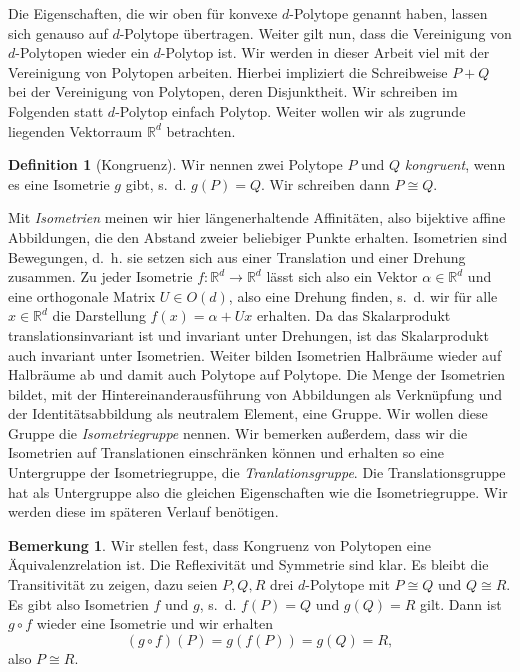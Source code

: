 \documentclass[11pt,titlepage]{article}
\newcommand{\setR}{\mathbb{R}}
\theoremstyle{definition}
\newtheorem{definition}[theorem]{Definition}
\newtheorem{remark}[theorem]{Bemerkung}
\theoremstyle{remark}
\begin{document}
	Die Eigenschaften, die wir oben für konvexe $d$-Polytope genannt haben, 
	lassen sich genauso auf $d$-Polytope übertragen. Weiter gilt nun, dass 
	die Vereinigung von $d$-Polytopen wieder ein $d$-Polytop ist. 
	Wir werden in dieser Arbeit viel mit der Vereinigung von Polytopen arbeiten. 
	Hierbei impliziert die Schreibweise $P+Q$ bei der Vereinigung von Polytopen, 
	deren Disjunktheit. Wir schreiben im Folgenden statt $d$-Polytop einfach Polytop. Weiter wollen wir als zugrunde liegenden Vektorraum $\setR^d$ 
	betrachten.
	
	\begin{definition}[Kongruenz] \label{def:kong}
		Wir nennen zwei Polytope $P$ und $Q$ \textsl{kongruent}, wenn es eine Isometrie $g$ gibt, s.~d. 
		$g(P)=Q$. Wir schreiben dann $P\cong Q$.
	\end{definition}
	
	 Mit \textsl{Isometrien} meinen wir hier längenerhaltende Affinitäten, 
	 also bijektive affine Abbildungen, die den Abstand zweier beliebiger Punkte erhalten. 
	 Isometrien sind Bewegungen, d.~h. sie setzen sich 
	 aus einer Translation und einer Drehung zusammen. Zu jeder 
	 Isometrie $f:\setR^d\to\setR^d$ lässt sich also ein Vektor 
	 $\alpha\in\setR^d$ und eine orthogonale Matrix $U\in O(d)$, also 
	 eine Drehung finden, s.~d. wir für alle $x\in \setR^d$ 
	 die Darstellung $f(x)=\alpha + Ux$ erhalten. 
	 Da das Skalarprodukt translationsinvariant ist und 
	 invariant unter Drehungen, ist das Skalarprodukt auch invariant 
	 unter Isometrien. Weiter bilden Isometrien Halbräume wieder auf 
	 Halbräume ab und damit auch Polytope auf Polytope. Die Menge 
	 der Isometrien bildet, mit der Hintereinanderausführung von Abbildungen als 
	 Verknüpfung und der Identitätsabbildung als neutralem Element, eine Gruppe. 
	 Wir wollen 
	 diese Gruppe die \textsl{Isometriegruppe} nennen. Wir bemerken außerdem, dass 
	 wir die Isometrien auf Translationen einschränken können und erhalten 
	 so eine Untergruppe der Isometriegruppe, die \textsl{Tranlationsgruppe}. Die 
	 Translationsgruppe hat als Untergruppe also die gleichen Eigenschaften wie die 
	 Isometriegruppe. Wir werden diese im späteren Verlauf benötigen.

	\begin{remark}
		Wir stellen fest, dass Kongruenz von Polytopen eine Äquivalenzrelation ist. 
		Die Reflexivität und Symmetrie sind klar. Es bleibt die Transitivität 
		zu zeigen, dazu seien 
		$P,Q,R$ drei $d$-Polytope mit $P\cong Q$ und $Q\cong R$. Es gibt also 
		Isometrien $f$ und $g$, s.~d. $f(P)=Q$ und $g(Q)=R$ gilt. Dann ist $g\circ f$ 
		wieder eine Isometrie und wir erhalten 
		\[(g\circ f)(P)=g(f(P))=g(Q)=R,\]
		also $P\cong R$. 
	\end{remark}
	
\end{document}
